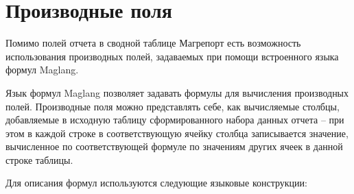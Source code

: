 \documentclass[../user-manual.tex]{subfiles}
\begin{document}
	\section{Производные поля}
	Помимо полей отчета в сводной таблице Магрепорт есть возможность использования производных полей, задаваемых при помощи встроенного языка формул Maglang.
	
	Язык формул Maglang позволяет задавать формулы для вычисления производных полей. Производные поля можно представлять себе, как вычисляемые столбцы, добавляемые в исходную таблицу сформированного набора данных отчета -- при этом в каждой строке в соответствующую ячейку столбца записывается значение, вычисленное по соответствующей формуле по значениям других ячеек в данной строке таблицы. 
	
	Для описания формул используются следующие языковые конструкции:
\end{document}
